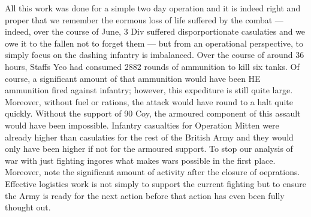\documentclass[noraggedright]{turabian-researchpaper}
\begin{document}
All this work was done for a simple two day operation and it is indeed right
and proper that we remember the eormous loss of life suffered by the combat
--- indeed, over the course of June, 3 Div suffered disporportionate 
casulaties and we owe it to the fallen not to forget them --- but from an
operational perspective, to simply focus on the dashing infantry is 
imbalanced.\autocite[112]{assault-div} Over the course of 
around 36 hours, Staffs Yeo had consumed 2882 rounds of ammunition to kill 
six tanks.\autocites[June appendix, Operation Mitten Intelligence Diary, 
Entry 58]{27wd}[on ammunition expediture, 27-8 June 1944]{90wd}  Of course, 
a significant amount of that ammunition would have been HE ammunition fired
against infantry; however, this expediture is still quite large.  Moreover,
without fuel or rations, the attack would have round to a halt quite quickly.
Without the support of 90 Coy, the armoured component of this assault would
have been impossible.  Infantry casualties for Operation Mitten were already
higher than casulaties for the rest of the British Army %
and they would only have been higher if not for the armoured support.  To stop
our analysis of war with just fighting ingores what makes wars possible in the
first place.
Moreover, note the significant amount of activity after the closure of 
oeprations.  Effective logistics work is not simply to support the current 
fighting but to ensure the Army is ready for the next action before that 
action has even been fully thought out.%



\end{document}
